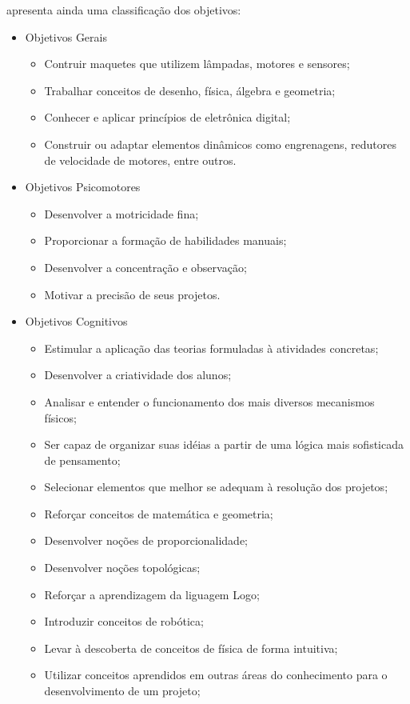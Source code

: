 \cite{zilli2004robotica} apresenta ainda uma classificação dos objetivos:
\begin{itemize}
\item Objetivos Gerais
\begin{itemize}
\item Contruir maquetes que utilizem lâmpadas, motores e sensores;
\item Trabalhar conceitos de desenho, física, álgebra e geometria;
\item Conhecer e aplicar princípios de eletrônica digital;
\item Construir ou adaptar elementos dinâmicos como engrenagens, redutores de velocidade de motores, entre outros.
\end{itemize}
\item Objetivos Psicomotores
\begin{itemize}
\item Desenvolver a motricidade fina;
\item Proporcionar a formação de habilidades manuais;
\item Desenvolver a concentração e observação;
\item Motivar a precisão de seus projetos.
\end{itemize}
\item Objetivos Cognitivos
\begin{itemize}
\item Estimular a aplicação das teorias formuladas à atividades concretas;
\item Desenvolver a criatividade dos alunos;
\item Analisar e entender o funcionamento dos mais diversos mecanismos físicos;
\item Ser capaz de organizar suas idéias a partir de uma lógica mais sofisticada de pensamento;
\item Selecionar elementos que melhor se adequam à resolução dos projetos;
\item Reforçar conceitos de matemática e geometria;
\item Desenvolver noções de proporcionalidade;
\item Desenvolver noções topológicas;
\item Reforçar a aprendizagem da liguagem Logo;
\item Introduzir conceitos de robótica;
\item Levar à descoberta de conceitos de física de forma intuitiva;
\item Utilizar conceitos aprendidos em outras áreas do conhecimento para o desenvolvimento de um projeto;

\end{itemize}
\end{itemize}

